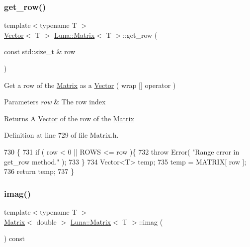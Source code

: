 \subsubsection{\texorpdfstring{get\+\_\+row()}{get\_row()}}
{\footnotesize\ttfamily template$<$typename T $>$ \\
\hyperlink{classLuna_1_1Vector}{Vector}$<$ T $>$ \hyperlink{classLuna_1_1Matrix}{Luna\+::\+Matrix}$<$ T $>$\+::get\+\_\+row (\begin{DoxyParamCaption}\item[{const std\+::size\+\_\+t \&}]{row }\end{DoxyParamCaption})\hspace{0.3cm}{\ttfamily [inline]}}



Get a row of the \hyperlink{classLuna_1_1Matrix}{Matrix} as a \hyperlink{classLuna_1_1Vector}{Vector} ( wrap \mbox{[}\mbox{]} operator ) 


\begin{DoxyParams}{Parameters}
{\em row} & The row index \\
\hline
\end{DoxyParams}
\begin{DoxyReturn}{Returns}
A \hyperlink{classLuna_1_1Vector}{Vector} of the row of the \hyperlink{classLuna_1_1Matrix}{Matrix} 
\end{DoxyReturn}


Definition at line 729 of file Matrix.\+h.


\begin{DoxyCode}
730   \{
731     \textcolor{keywordflow}{if} ( row < 0 || ROWS <= row )\{
732       \textcolor{keywordflow}{throw} Error( \textcolor{stringliteral}{"Range error in get\_row method."} );
733     \}
734     Vector<T> temp;
735     temp = MATRIX[ row ];
736     \textcolor{keywordflow}{return} temp;
737   \}
\end{DoxyCode}
\mbox{\label{classLuna_1_1Matrix_ac6e74a5d4ef4af6e6d574f9c059b5c01}} 
\subsubsection{\texorpdfstring{imag()}{imag()}}
{\footnotesize\ttfamily template$<$typename T $>$ \\
\hyperlink{classLuna_1_1Matrix}{Matrix}$<$ double $>$ \hyperlink{classLuna_1_1Matrix}{Luna\+::\+Matrix}$<$ T $>$\+::imag (\begin{DoxyParamCaption}{ }\end{DoxyParamCaption}) const\hspace{0.3cm}{\ttfamily [inline]}}



